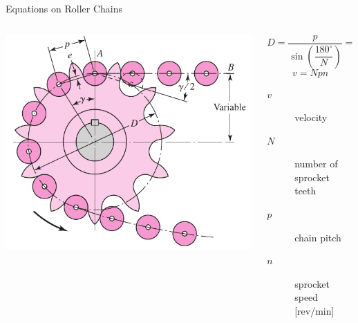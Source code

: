 \documentclass[10pt, svgnames]{beamer}
\begin{document}
\begin{frame}[label={sec:org528d247}]{Equations on Roller Chains}
\begin{columns}
\begin{column}{0.5\columnwidth}
\begin{center}
\includegraphics[height=\textwidth]{./pictures/chordal-speed-variation.png}
\end{center}
\end{column}

\begin{column}{0.5\columnwidth}
$$ D = \frac{p}{\sin \left( \dfrac{180^{\circ}}{N} \right)} = \frac{p}{\sin \left(\dfrac{\gamma}{2} \right)} $$
$$ v = N pn $$

\begin{description}
\item[{\(v\)}] velocity
\item[{\(N\)}] number of sprocket teeth
\item[{\(p\)}] chain pitch
\item[{\(n\)}] sprocket speed [rev/min]
\end{description}
\end{column}
\end{columns}
\end{frame}
\end{document}
